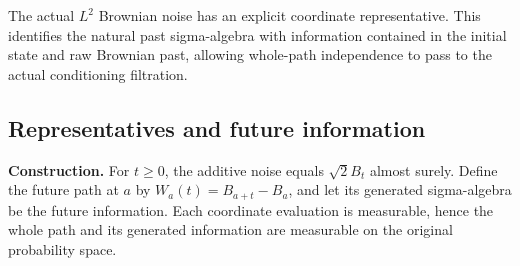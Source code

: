 \documentclass[11pt,a4paper]{report}
\begin{document}
The actual \(L^2\) Brownian noise has an explicit coordinate representative. This identifies the natural past sigma-algebra with information contained in the initial state and raw Brownian past, allowing whole-path independence to pass to the actual conditioning filtration.

\subsection{\texorpdfstring{Representatives and future information}{Representatives and future information}}
\label{report-step-WassersteinMixing-ActualMarkovPast-lean-1}


\textbf{Construction.} For \(t\ge0\), the additive noise equals \(\sqrt2 B_t\) almost surely. Define the future path at \(a\) by \(W_a(t)=B_{a+t}-B_a\), and let its generated sigma-algebra be the future information. Each coordinate evaluation is measurable, hence the whole path and its generated information are measurable on the original probability space.
\end{document}

